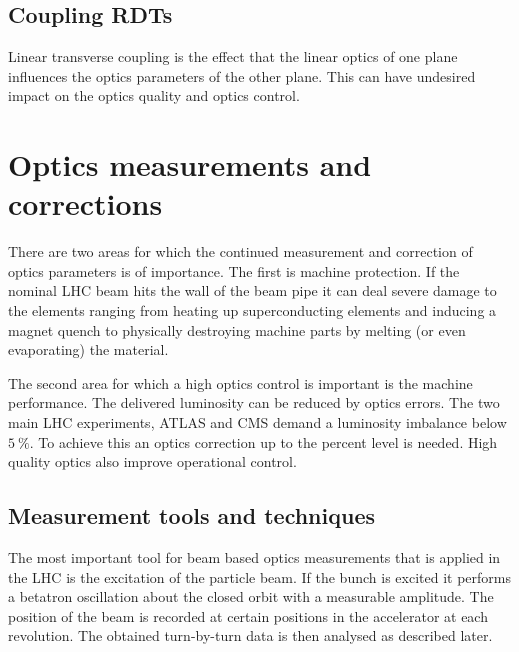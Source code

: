 
\subsection{Coupling RDTs}

Linear transverse coupling is the effect that the linear optics of one plane influences the optics
parameters of the other plane. This can have undesired impact on the optics quality and optics
control.



\section{Optics measurements and corrections}

There are two areas for which the continued measurement and correction of optics parameters is of
importance. The first is machine protection. If the nominal LHC beam hits the wall of the beam pipe
it can deal severe damage to the elements ranging from heating up superconducting elements and
inducing a magnet quench to physically destroying machine parts by melting (or even evaporating) the
material.

The second area for which a high optics control is important is the machine performance.
The delivered luminosity can be reduced by optics errors.
The two main LHC experiments, ATLAS and CMS demand a luminosity imbalance below $\SI{5}{\percent}$.
To achieve this an optics correction up to the percent level is needed.
High quality optics also improve operational control.

\subsection{Measurement tools and techniques}

The most important tool for beam based optics measurements that is applied in the LHC is the excitation
of the particle beam.
If the bunch is excited it performs a betatron oscillation about the closed orbit with a measurable amplitude.
The position of the beam is recorded at certain positions in the accelerator at each revolution. The
obtained turn-by-turn data is then analysed as described later.

